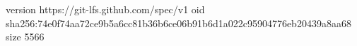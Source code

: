 version https://git-lfs.github.com/spec/v1
oid sha256:74e0f74aa72ce9b5a6cc81b36b6ce06b91b6d1a022c95904776eb20439a8aa68
size 5566
